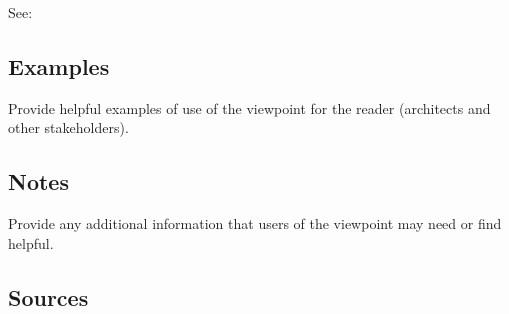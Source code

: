 See: 


\subsection{Examples \Optional} 

Provide helpful examples of use of the viewpoint for the reader
(architects and other stakeholders).


\subsection{Notes \Optional} 

Provide any additional information that users of the viewpoint may
need or find helpful.


\subsection{Sources} 


